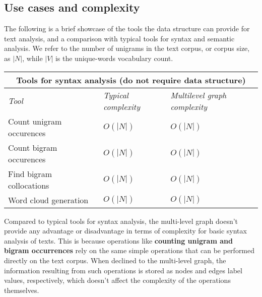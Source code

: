 \subsection{Use cases and complexity}
\bigskip
The following is a brief showcase of the tools the data structure can provide for text analysis, and a comparison
with typical tools for syntax and semantic analysis. \newline
We refer to the number of unigrams in the text corpus, or corpus size, as $|N|$, while $|V|$ is the unique-words
vocabulary count. \newline \newline

\begin{table}[hbt!]
    \begin{tabular}{|l|l|l|}
        \hline
        \multicolumn{3}{|c|}{\textbf{Tools for syntax analysis (do not require data structure)}} \\ [0.5ex]
        \hline
        \textit{Tool}  &  \textit{Typical complexity}  & \textit{Multilevel graph complexity} \\  [0.5ex]
        \hline
        \large Count unigram occurences    \,\,    &  \large$O(|N|)$                 &  \large$O(|N|)$ \\
        \hline
        \large Count bigram occurences         &  \large$O(|N|)$                 &  \large$O(|N|)$ \\
        \hline
        \large Find bigram collocations        &  \large$O(|N|)$                 &  \large$O(|N|)$ \\
        \hline
        \large Word cloud generation           &  \large$O(|N|)$                 &  \large$O(|N|)$ \\
        \hline
    \end{tabular}\label{tab:table1}
\end{table}

Compared to typical tools for syntax analysis, the multi-level graph doesn't provide any advantage or disadvantage in
terms of complexity for basic syntax analysis of texts. \newline
This is because operations like \textbf{counting unigram and bigram occurrences} rely on the same simple operations
that can be performed directly on the text corpus.
When declined to the multi-level graph, the information resulting from such operations is stored as
nodes and edges label values, respectively, which doesn't affect the complexity of the operations themselves. \newline

